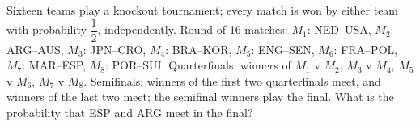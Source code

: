 Sixteen teams play a knockout tournament; every match is won by either team with probability $\dfrac12$, independently. Round-of-16 matches: $M_1$: NED--USA, $M_2$: ARG--AUS, $M_3$: JPN--CRO, $M_4$: BRA--KOR, $M_5$: ENG--SEN, $M_6$: FRA--POL, $M_7$: MAR--ESP, $M_8$: POR--SUI. Quarterfinals: winners of $M_1$ v $M_2$, $M_3$ v $M_4$, $M_5$ v $M_6$, $M_7$ v $M_8$. Semifinals: winners of the first two quarterfinals meet, and winners of the last two meet; the semifinal winners play the final. What is the probability that ESP and ARG meet in the final?
